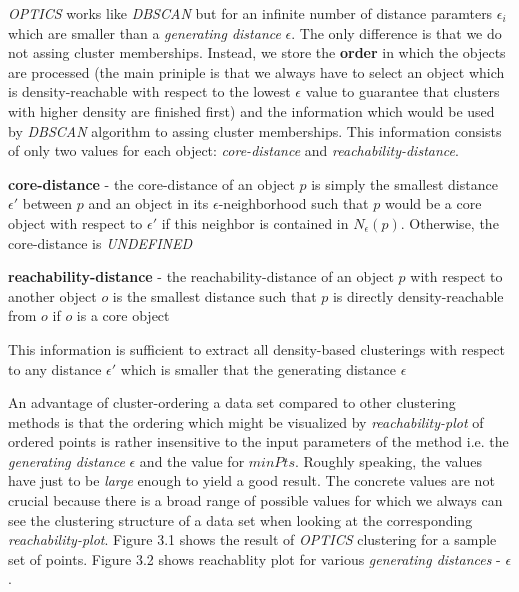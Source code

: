 \textit{OPTICS} works like \textit{DBSCAN} but for an infinite number of
distance paramters $\epsilon_i$ which are smaller than a \textit{generating distance}
$\epsilon$. The only difference is that we do not assing cluster memberships.
Instead, we store the \textbf{order} in which the objects are processed (the
main priniple is that we always have to select an object which is
density-reachable with respect to the lowest $\epsilon$ value to guarantee that
clusters with higher density are finished first) and the information which would
be used by \textit{DBSCAN} algorithm to assing cluster memberships. This
information consists of only two values for each object: \textit{core-distance}
and \textit{reachability-distance}.


\begin{definition}\label{def:core-distance} 
\textbf{core-distance} - the core-distance of an object $p$
is simply the smallest distance $\epsilon'$ between $p$ and an object in its
$\epsilon$-neighborhood such that $p$ would be a core object with respect to
$\epsilon'$ if this neighbor is contained in $N_\epsilon(p)$. Otherwise, the
core-distance is \textit{UNDEFINED}
\end{definition}


\begin{definition}\label{def:reachability-distance} 
\textbf{reachability-distance} - the reachability-distance
of an object $p$ with respect to another object $o$ is the smallest distance such that $p$ is
directly density-reachable from $o$ if $o$ is a core object
\end{definition}

This information is sufficient to extract all density-based clusterings
with respect to any distance $\epsilon'$ which is smaller that the generating
distance $\epsilon$

An advantage of cluster-ordering a data set compared to other clustering methods
is that the ordering which might be visualized by \textit{reachability-plot} of
ordered points is rather insensitive to the input parameters of the method i.e.
the \textit{generating distance} $\epsilon$ and the value for $minPts$. Roughly
speaking, the values have just to be \textit{large} enough to yield a good
result. The concrete values are not crucial because there is a broad range of
possible values for which we always can see the clustering structure of a data
set when looking at the corresponding \textit{reachability-plot}. Figure 3.1
shows the result of \textit{OPTICS} clustering for a sample set of points.
Figure 3.2 shows reachablity plot for various \textit{generating distances} -
$\epsilon$. 

